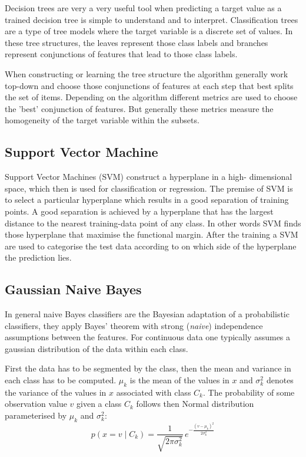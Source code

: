 \documentclass[a4paper,11pt]{article}
\begin{document}
Decision trees are very a very useful tool when predicting a target value as a trained decision tree is simple to understand and to interpret. Classification trees are a type of tree models where the target variable is a discrete set of values. In these tree structures, the leaves represent those class labels and branches represent conjunctions of features that lead to those class labels.

When constructing or learning the tree structure the algorithm generally work top-down and choose those conjunctions of features at each step that best splits the set of items. Depending on the algorithm different metrics are used to choose the 'best' conjunction of features. But generally these metrics measure the homogeneity of the target variable within the subsets.

\subsection*{Support Vector Machine}

Support Vector Machines (SVM) construct a hyperplane in a high- dimensional space, which then is  used for classification or regression. The premise of SVM is to select a particular hyperplane which results in a  good separation of training points. A good separation is achieved by a hyperplane that has the largest distance to the nearest training-data point of any class. In other words SVM finds those hyperplane that maximise the  functional margin. After the training a SVM are used to categorise the test data according to on which side of the hyperplane the prediction lies.

\subsection*{Gaussian Naive Bayes}

In general naive Bayes classifiers are the Bayesian adaptation of a probabilistic classifiers, they apply Bayes' theorem with strong (\textit{naive}) independence assumptions between the features.
For continuous data one typically assumes a gaussian distribution of the data within each class.

First the data has to be segmented by the class, then the mean and variance in each class has to be computed. $ \mu _{k}$ is the mean of the values in $x$ and  $ \sigma _{k}^{2}$ denotes the variance of the values in $x$ associated with class $C_k$.
The probability of some observation value $v$ given a class $C_{k}$ follows then Normal distribution parameterised by $\mu _{k}$ and $\sigma _{k}^{2}$:
$$  p(x=v\mid C_{k})={\frac {1}{\sqrt {2\pi \sigma _{k}^{2}}}}\,e^{-{\frac {(v-\mu _{k})^{2}}{2\sigma _{k}^{2}}}} $$
\end{document}
